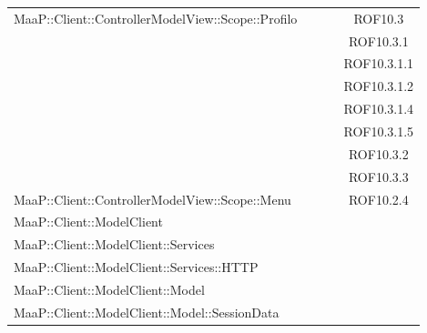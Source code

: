 \begin{center}
\begin{longtable}{|p{0.8\linewidth}|c|}
\midrule 
MaaP::Client::ControllerModelView::Scope::Profilo
& ROF10.3\\
& ROF10.3.1\\
& ROF10.3.1.1\\
& ROF10.3.1.2\\
& ROF10.3.1.4\\
& ROF10.3.1.5\\
& ROF10.3.2\\
& ROF10.3.3\\


\midrule 
MaaP::Client::ControllerModelView::Scope::Menu
& ROF10.2.4\\

\midrule 
MaaP::Client::ModelClient
& \\

\midrule 
MaaP::Client::ModelClient::Services
& \\

\midrule 
MaaP::Client::ModelClient::Services::HTTP
& \\

\midrule 
MaaP::Client::ModelClient::Model
& \\

\midrule 
MaaP::Client::ModelClient::Model::SessionData
& \\

\end{longtable}
\end{center}

